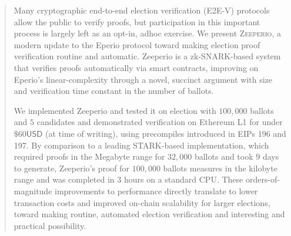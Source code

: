 \begin{abstract}
Many cryptographic end-to-end election verification (E2E-V) protocols allow the public to verify proofs, but participation in this important process is largely left as an opt-in, adhoc exercise. We present \textsc{Zeeperio}, a modern update to the Eperio protocol toward making election proof verification routine and automatic. Zeeperio is a zk-SNARK-based system that verifies proofs automatically via smart contracts, improving on Eperio's linear-complexity through a novel, succinct argument with size and verification time constant in the number of ballots. 

We implemented Zeeperio and tested it on election with $100,000$ ballots and $5$ candidates and demonstrated verification on Ethereum L1 for under $\$60 \mathsf{USD}$ (at time of writing), using precompiles introduced in EIPs 196 and 197. By comparison to a leading STARK-based implementation, which required proofs in the Megabyte range for $32,000$ ballots and took $9$ days to generate, Zeeperio's proof for $100,000$ ballots measures in the kilobyte range and was completed in $3$ hours on a standard CPU. These orders-of-magnitude improvements to performance directly translate to lower transaction costs and improved on-chain scalability for larger elections, toward making routine, automated election verification and interesting and practical possibility.

\end{abstract}